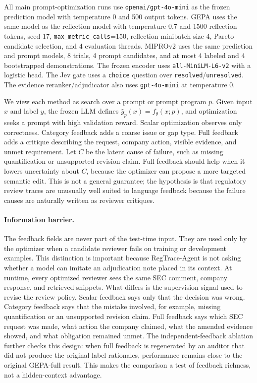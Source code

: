 \documentclass[11pt]{article}
\newcommand{\framework}{RegTrace-Agent}
\begin{document}
All main prompt-optimization runs use \texttt{openai/gpt-4o-mini} as the frozen prediction model with temperature 0 and 500 output tokens. GEPA uses the same model as the reflection model with temperature 0.7 and 1500 reflection tokens, seed 17, \texttt{max\_metric\_calls}=150, reflection minibatch size 4, Pareto candidate selection, and 4 evaluation threads. MIPROv2 uses the same prediction and prompt models, 8 trials, 4 prompt candidates, and at most 4 labeled and 4 bootstrapped demonstrations. The frozen encoder uses \texttt{all-MiniLM-L6-v2} with a logistic head. The Jev gate uses a \texttt{choice} question over \texttt{resolved}/\texttt{unresolved}. The evidence reranker/adjudicator also uses \texttt{gpt-4o-mini} at temperature 0.

We view each method as search over a prompt or prompt program $p$. Given input $x$ and label $y$, the frozen LLM defines $\hat{y}_{p}(x)=f_{\theta}(x;p)$, and optimization seeks a prompt with high validation reward. Scalar optimization observes only correctness. Category feedback adds a coarse issue or gap type. Full feedback adds a critique describing the request, company action, visible evidence, and unmet requirement. Let $C$ be the latent cause of failure, such as missing quantification or unsupported revision claim. Full feedback should help when it lowers uncertainty about $C$, because the optimizer can propose a more targeted semantic edit. This is not a general guarantee; the hypothesis is that regulatory review traces are unusually well suited to language feedback because the failure causes are naturally written as reviewer critiques.

\paragraph{Information barrier.}
The feedback fields are never part of the test-time input. They are used only by the optimizer when a candidate reviewer fails on training or development examples. This distinction is important because \framework{} is not asking whether a model can imitate an adjudication note placed in its context. At runtime, every optimized reviewer sees the same SEC comment, company response, and retrieved snippets. What differs is the supervision signal used to revise the review policy. Scalar feedback says only that the decision was wrong. Category feedback says that the mistake involved, for example, missing quantification or an unsupported revision claim. Full feedback says which SEC request was made, what action the company claimed, what the amended evidence showed, and what obligation remained unmet. The independent-feedback ablation further checks this design: when full feedback is regenerated by an auditor that did not produce the original label rationales, performance remains close to the original GEPA-full result. This makes the comparison a test of feedback richness, not a hidden-context advantage.
\end{document}
